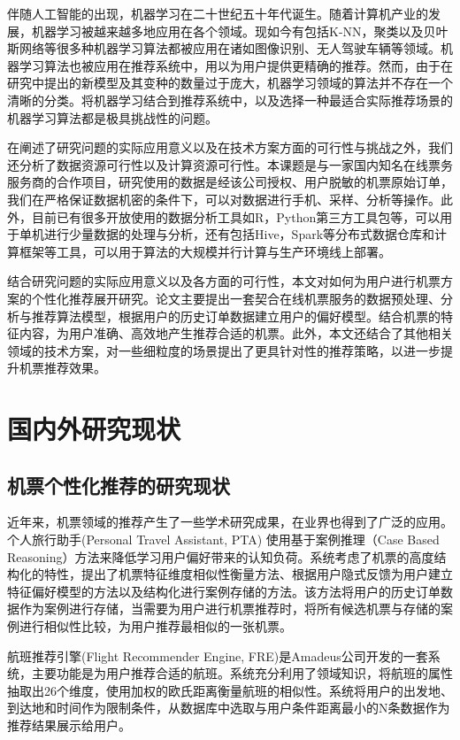伴随人工智能的出现，机器学习在二十世纪五十年代诞生\cite{portugal2015use}。随着计算机产业的发展，机器学习被越来越多地应用在各个领域。现如今有包括K-NN，聚类以及贝叶斯网络等很多种机器学习算法都被应用在诸如图像识别、无人驾驶车辆等领域。机器学习算法也被应用在推荐系统中，用以为用户提供更精确的推荐。然而，由于在研究中提出的新模型及其变种的数量过于庞大，机器学习领域的算法并不存在一个清晰的分类。将机器学习结合到推荐系统中，以及选择一种最适合实际推荐场景的机器学习算法都是极具挑战性的问题。

在阐述了研究问题的实际应用意义以及在技术方案方面的可行性与挑战之外，我们还分析了数据资源可行性以及计算资源可行性。本课题是与一家国内知名在线票务服务商的合作项目，研究使用的数据是经该公司授权、用户脱敏的机票原始订单，我们在严格保证数据机密的条件下，可以对数据进行手机、采样、分析等操作。此外，目前已有很多开放使用的数据分析工具如R，Python第三方工具包等，可以用于单机进行少量数据的处理与分析，还有包括Hive，Spark等分布式数据仓库和计算框架等工具，可以用于算法的大规模并行计算与生产环境线上部署。

结合研究问题的实际应用意义以及各方面的可行性，本文对如何为用户进行机票方案的个性化推荐展开研究。论文主要提出一套契合在线机票服务的数据预处理、分析与推荐算法模型，根据用户的历史订单数据建立用户的偏好模型。结合机票的特征内容，为用户准确、高效地产生推荐合适的机票。此外，本文还结合了其他相关领域的技术方案，对一些细粒度的场景提出了更具针对性的推荐策略，以进一步提升机票推荐效果。

\section{国内外研究现状}
\subsection{机票个性化推荐的研究现状}
近年来，机票领域的推荐产生了一些学术研究成果，在业界也得到了广泛的应用。个人旅行助手(Personal Travel Assistant, PTA)\cite{coyle2004making} 使用基于案例推理（Case Based Reasoning）\cite{aamodt1994case,kolodner2014case}方法来降低学习用户偏好带来的认知负荷。系统考虑了机票的高度结构化的特性，提出了机票特征维度相似性衡量方法、根据用户隐式反馈为用户建立特征偏好模型的方法以及结构化进行案例存储的方法。该方法将用户的历史订单数据作为案例进行存储，当需要为用户进行机票推荐时，将所有候选机票与存储的案例进行相似性比较，为用户推荐最相似的一张机票。

航班推荐引擎(Flight Recommender Engine, FRE)\cite{barth2014design}是Amadeus公司开发的一套系统，主要功能是为用户推荐合适的航班。系统充分利用了领域知识，将航班的属性抽取出26个维度，使用加权的欧氏距离衡量航班的相似性。系统将用户的出发地、到达地和时间作为限制条件，从数据库中选取与用户条件距离最小的N条数据作为推荐结果展示给用户。

